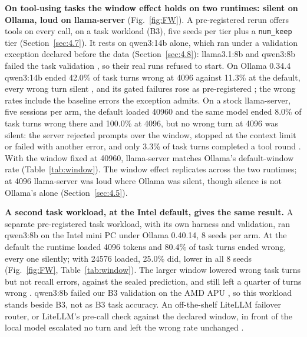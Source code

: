 \documentclass[conference,10pt]{IEEEtran}
\begin{document}
\textbf{On tool-using tasks the window effect holds on two runtimes: silent on Ollama, loud on llama-server} (Fig.~\ref{fig:FW}). A pre-registered rerun offers tools on every call, on a task workload (B3), five seeds per tier plus a \texttt{num\_keep} tier (Section~\ref{sec:4.7}). It rests on qwen3:14b alone, which ran under a validation exception declared before the data (Section~\ref{sec:4.8}): llama3.1:8b and qwen3:8b failed the task validation%
, so their real runs refused to start. On Ollama 0.34.4 qwen3:14b ended 42.0\% of task turns wrong at 4096 against 11.3\% at the default, every wrong turn silent%
, and its gated failures rose as pre-registered%
; the wrong rates include the baseline errors the exception admits. On a stock llama-server, five sessions per arm, the default loaded 40960 and the same model ended 8.0\% of task turns wrong there and 100.0\% at 4096, but no wrong turn at 4096 was silent: the server rejected prompts over the window, stopped at the context limit or failed with another error, and only 3.3\% of task turns completed a tool round%
. With the window fixed at 40960, llama-server matches Ollama's default-window rate %
(Table~\ref{tab:window}). The window effect replicates across the two runtimes; at 4096 llama-server was loud where Ollama was silent, though silence is not Ollama's alone (Section~\ref{sec:4.5}).

\textbf{A second task workload, at the Intel default, gives the same result.} A separate pre-registered task workload, with its own harness and validation, ran qwen3:8b on the Intel mini PC under Ollama 0.40.14, 8 seeds per arm. At the default the runtime loaded 4096 tokens and 80.4\% of task turns ended wrong, every one silently; with 24576 loaded, 25.0\% did, lower in all 8 seeds %
(Fig.~\ref{fig:FW}, Table~\ref{tab:window}). The larger window lowered wrong task turns but not recall errors, against the sealed prediction, and still left a quarter of turns wrong%
. qwen3:8b failed our B3 validation on the AMD APU%
, so this workload stands beside B3, not as B3 task accuracy. An off-the-shelf LiteLLM failover router, or LiteLLM's pre-call check against the declared window, in front of the local model escalated no turn and left the wrong rate unchanged%
.
\end{document}
